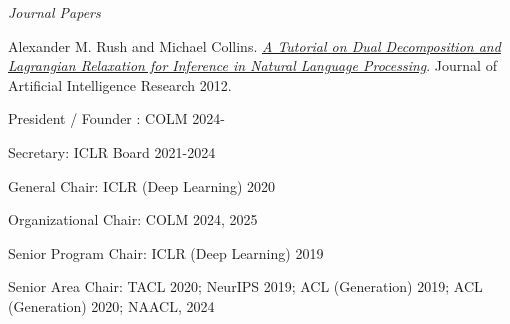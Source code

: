 \documentclass[10pt]{article}
\begin{document}
{%

\vspace{0.3in}

\noindent\emph{Journal Papers \vspace{0.01in}}

\ind Alexander M. Rush and Michael Collins. \emph{\href{http://www.cs.columbia.edu/~mcollins/acltutorial.pdf}{A Tutorial on Dual Decomposition and Lagrangian Relaxation for Inference in Natural Language Processing}}. Journal of Artificial Intelligence Research 2012.









\medskip


\bigskip

\ind President / Founder :
\ind COLM 2024-

\ind Secretary:
\ind ICLR Board 2021-2024

\ind General  Chair:
\ind ICLR (Deep Learning) 2020

\ind Organizational Chair:
\ind COLM 2024, 2025

\ind Senior Program Chair:
\ind ICLR (Deep Learning) 2019

\ind Senior Area Chair:
\ind TACL 2020; NeurIPS 2019; ACL (Generation) 2019; ACL (Generation) 2020; NAACL, 2024

}
\end{document}
